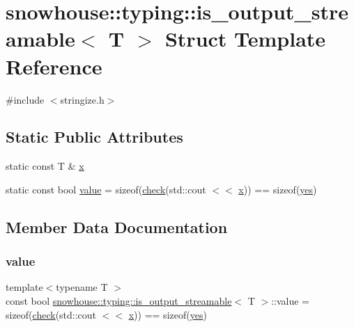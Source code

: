 \hypertarget{structsnowhouse_1_1typing_1_1is__output__streamable}{}\section{snowhouse\+::typing\+::is\+\_\+output\+\_\+streamable$<$ T $>$ Struct Template Reference}
\label{structsnowhouse_1_1typing_1_1is__output__streamable}


{\ttfamily \#include $<$stringize.\+h$>$}

\subsection*{Static Public Attributes}
\begin{DoxyCompactItemize}
\item 
static const T \& \mbox{\hyperlink{structsnowhouse_1_1typing_1_1is__output__streamable_a680344f2a7ab0b3437f79957032ba326}{x}}
\item 
static const bool \mbox{\hyperlink{structsnowhouse_1_1typing_1_1is__output__streamable_aaea4d934726085165d83eb31c9ce9433}{value}} = sizeof(\mbox{\hyperlink{namespacesnowhouse_1_1typing_a8d1fa0dba5f3c09df59b67e070ef6deb}{check}}(std\+::cout $<$$<$ \mbox{\hyperlink{structsnowhouse_1_1typing_1_1is__output__streamable_a680344f2a7ab0b3437f79957032ba326}{x}})) == sizeof(\mbox{\hyperlink{namespacesnowhouse_1_1typing_a4b319cb7567ee3475023c05ed2dadb16}{yes}})
\end{DoxyCompactItemize}


\subsection{Member Data Documentation}
\mbox{\label{structsnowhouse_1_1typing_1_1is__output__streamable_aaea4d934726085165d83eb31c9ce9433}} 
\subsubsection{\texorpdfstring{value}{value}}
{\footnotesize\ttfamily template$<$typename T $>$ \\
const bool \mbox{\hyperlink{structsnowhouse_1_1typing_1_1is__output__streamable}{snowhouse\+::typing\+::is\+\_\+output\+\_\+streamable}}$<$ T $>$\+::value = sizeof(\mbox{\hyperlink{namespacesnowhouse_1_1typing_a8d1fa0dba5f3c09df59b67e070ef6deb}{check}}(std\+::cout $<$$<$ \mbox{\hyperlink{structsnowhouse_1_1typing_1_1is__output__streamable_a680344f2a7ab0b3437f79957032ba326}{x}})) == sizeof(\mbox{\hyperlink{namespacesnowhouse_1_1typing_a4b319cb7567ee3475023c05ed2dadb16}{yes}})\hspace{0.3cm}{\ttfamily [static]}}

